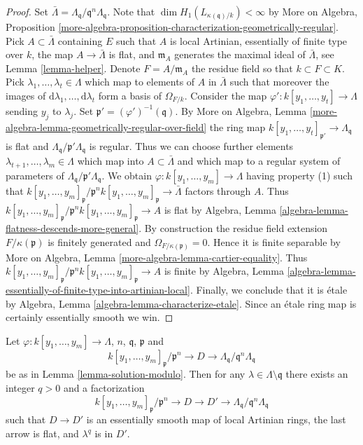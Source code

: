 \begin{proof}
Set $\bar \Lambda = \Lambda_\mathfrak q/\mathfrak q^n\Lambda_\mathfrak q$.
Note that $\dim H_1(L_{\kappa(\mathfrak q)/k}) < \infty$ by
More on Algebra, Proposition
\ref{more-algebra-proposition-characterization-geometrically-regular}.
Pick $A \subset \bar \Lambda$ containing $E$ such that $A$ is local
Artinian, essentially of finite type over $k$, the map
$A \to \bar \Lambda$ is flat, and $\mathfrak m_A$ generates the maximal
ideal of $\bar \Lambda$, see Lemma \ref{lemma-helper}.
Denote $F = A/\mathfrak m_A$ the residue field so that $k \subset F \subset K$.
Pick $\lambda_1, \ldots, \lambda_t \in \Lambda$ which map
to elements of $A$ in $\bar \Lambda$ such that moreover the images
of $\text{d}\lambda_1, \ldots, \text{d}\lambda_t$ form a basis
of $\Omega_{F/k}$. Consider the map
$\varphi' : k[y_1, \ldots, y_t] \to \Lambda$ sending $y_j$ to $\lambda_j$.
Set $\mathfrak p' = (\varphi')^{-1}(\mathfrak q)$. By
More on Algebra, Lemma
\ref{more-algebra-lemma-geometrically-regular-over-field}
the ring map $k[y_1, \ldots, y_t]_{\mathfrak p'} \to \Lambda_\mathfrak q$
is flat and $\Lambda_\mathfrak q/\mathfrak p' \Lambda_\mathfrak q$ is
regular. Thus we can choose further elements
$\lambda_{t + 1}, \ldots, \lambda_m \in \Lambda$
which map into $A \subset \bar \Lambda$ and which
map to a regular system of parameters of
$\Lambda_\mathfrak q/\mathfrak p' \Lambda_\mathfrak q$.
We obtain $\varphi : k[y_1, \ldots, y_m] \to \Lambda$ having
property (1) such that
$k[y_1, \ldots, y_m]_\mathfrak p/\mathfrak p^n k[y_1, \ldots, y_m]_\mathfrak p
\to \bar\Lambda$
factors through $A$. Thus
$k[y_1, \ldots, y_m]_\mathfrak p/\mathfrak p^n k[y_1, \ldots, y_m]_\mathfrak p
\to A$ is flat by
Algebra, Lemma \ref{algebra-lemma-flatness-descends-more-general}.
By construction the residue field extension $F/\kappa(\mathfrak p)$
is finitely generated and $\Omega_{F/\kappa(\mathfrak p)} = 0$. Hence it is
finite separable by
More on Algebra, Lemma \ref{more-algebra-lemma-cartier-equality}.
Thus
$k[y_1, \ldots, y_m]_\mathfrak p/\mathfrak p^n k[y_1, \ldots, y_m]_\mathfrak p
\to A$
is finite by Algebra, Lemma
\ref{algebra-lemma-essentially-of-finite-type-into-artinian-local}.
Finally, we conclude that it is \'etale by
Algebra, Lemma \ref{algebra-lemma-characterize-etale}.
Since an \'etale ring map is certainly essentially smooth we win.
\end{proof}

\begin{lemma}
\label{lemma-enlarge-solution-modulo}
Let $\varphi : k[y_1, \ldots, y_m] \to \Lambda$, $n$, $\mathfrak q$,
$\mathfrak p$ and
$$
k[y_1, \ldots, y_m]_\mathfrak p/\mathfrak p^n \to
D \to \Lambda_\mathfrak q/\mathfrak q^n \Lambda_\mathfrak q
$$
be as in Lemma \ref{lemma-solution-modulo}. Then for any
$\lambda \in \Lambda \setminus \mathfrak q$
there exists an integer $q > 0$ and a factorization
$$
k[y_1, \ldots, y_m]_\mathfrak p/\mathfrak p^n \to
D \to D' \to \Lambda_\mathfrak q/\mathfrak q^n \Lambda_\mathfrak q
$$
such that $D \to D'$ is an essentially smooth map of local Artinian rings,
the last arrow is flat, and $\lambda^q$ is in $D'$.
\end{lemma}

